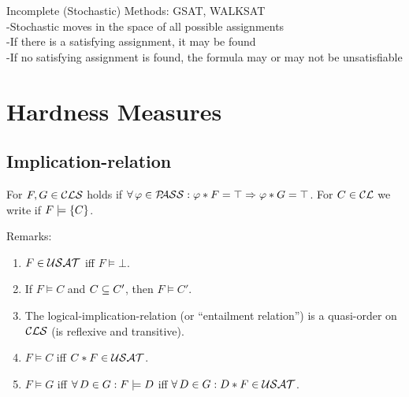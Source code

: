 \documentclass[12pt]{book}
\begin{document}
Incomplete (Stochastic) Methods: GSAT, WALKSAT\\
-Stochastic moves in the space of all possible assignments\\
-If there is a satisfying assignment, it may be found\\
-If no satisfying assignment is found, the formula may or may not be unsatisfiable\\
\chapter{Hardness Measures}
\label{cha:Hardness Measures}

\section{Implication-relation}
\label{sec:Implication-relation}

\begin{defi}\label{def:models}
  For $F, G \in \mathcal{CLS}$ holds  if $\forall\, \varphi \in \mathcal{P\hspace{-0.32em}ASS} : \varphi * F = \top \Rightarrow \varphi * G = \top$. For $C \in \mathcal{CL}$ we write  if $F \models \{ C \}$.
\end{defi}
Remarks:
\begin{enumerate}
\item $F \in \mathcal{USAT}$ iff $F \models \bot$.
\item If $F \models C$ and $C \subseteq C'$, then $F \models C'$.
\item The logical-implication-relation (or ``entailment relation'') is a quasi-order on $\mathcal{CLS}$ (is reflexive and transitive).
\item $F \models C$ iff $C * F \in \mathcal{USAT}$.
\item $F \models G$ iff $\forall\, D \in G : F \models D$ iff $\forall\, D \in G : D * F \in \mathcal{USAT}$.
\end{enumerate}
\end{document}
